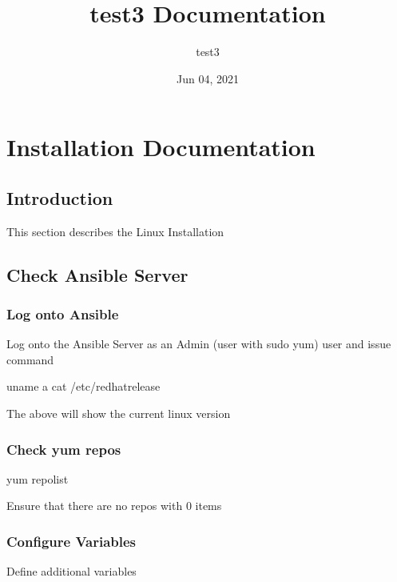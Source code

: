 \documentclass[letterpaper,10pt,english]{sphinxmanual}
\title{test3 Documentation}
\date{Jun 04, 2021}
\author{test3}
\begin{document}
\pagestyle{empty}
\sphinxmaketitle
\pagestyle{plain}
\sphinxtableofcontents
\pagestyle{normal}
\label{\detokenize{index::doc}}



\chapter{Installation Documentation}
\label{\detokenize{install:installation-documentation}}\label{\detokenize{install::doc}}

\section{Introduction}
\label{\detokenize{install:introduction}}
\sphinxAtStartPar
This section describes the Linux Installation


\section{Check Ansible Server}
\label{\detokenize{install:check-ansible-server}}

\subsection{Log onto Ansible}
\label{\detokenize{install:log-onto-ansible}}
\sphinxAtStartPar
Log onto the Ansible Server as an Admin (user with sudo yum) user and issue command

\begin{sphinxVerbatim}[commandchars=\\\{\}]
uname \PYGZhy{}a
cat /etc/redhat\PYGZhy{}release
\end{sphinxVerbatim}

\sphinxAtStartPar
The above will show the current linux version


\subsection{Check yum repos}
\label{\detokenize{install:check-yum-repos}}
\begin{sphinxVerbatim}[commandchars=\\\{\}]
yum repolist
\end{sphinxVerbatim}

\sphinxAtStartPar
Ensure that there are no repos with 0 items


\subsection{Configure Variables}
\label{\detokenize{install:configure-variables}}
\sphinxAtStartPar
Define additional variables
\end{document}
